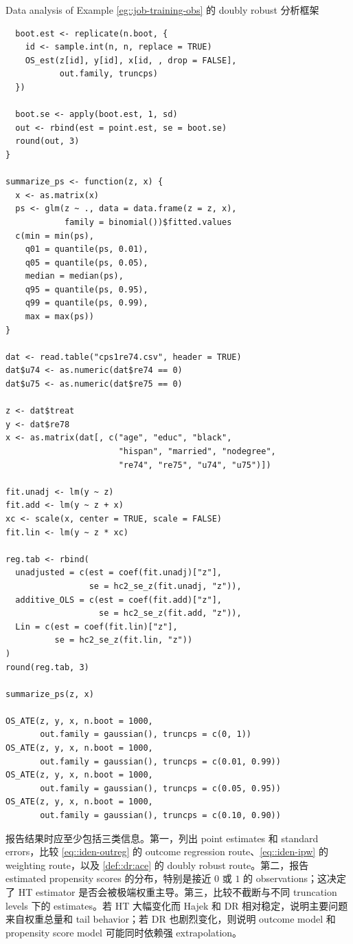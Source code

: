 \begin{exercisesolution}{Data analysis of Example \cref{eg::job-training-obs}}{ 的 doubly robust 分析框架}
\begin{lstlisting}
  boot.est <- replicate(n.boot, {
    id <- sample.int(n, n, replace = TRUE)
    OS_est(z[id], y[id], x[id, , drop = FALSE],
           out.family, truncps)
  })

  boot.se <- apply(boot.est, 1, sd)
  out <- rbind(est = point.est, se = boot.se)
  round(out, 3)
}

summarize_ps <- function(z, x) {
  x <- as.matrix(x)
  ps <- glm(z ~ ., data = data.frame(z = z, x),
            family = binomial())$fitted.values
  c(min = min(ps),
    q01 = quantile(ps, 0.01),
    q05 = quantile(ps, 0.05),
    median = median(ps),
    q95 = quantile(ps, 0.95),
    q99 = quantile(ps, 0.99),
    max = max(ps))
}

dat <- read.table("cps1re74.csv", header = TRUE)
dat$u74 <- as.numeric(dat$re74 == 0)
dat$u75 <- as.numeric(dat$re75 == 0)

z <- dat$treat
y <- dat$re78
x <- as.matrix(dat[, c("age", "educ", "black",
                       "hispan", "married", "nodegree",
                       "re74", "re75", "u74", "u75")])

fit.unadj <- lm(y ~ z)
fit.add <- lm(y ~ z + x)
xc <- scale(x, center = TRUE, scale = FALSE)
fit.lin <- lm(y ~ z * xc)

reg.tab <- rbind(
  unadjusted = c(est = coef(fit.unadj)["z"],
                 se = hc2_se_z(fit.unadj, "z")),
  additive_OLS = c(est = coef(fit.add)["z"],
                   se = hc2_se_z(fit.add, "z")),
  Lin = c(est = coef(fit.lin)["z"],
          se = hc2_se_z(fit.lin, "z"))
)
round(reg.tab, 3)

summarize_ps(z, x)

OS_ATE(z, y, x, n.boot = 1000,
       out.family = gaussian(), truncps = c(0, 1))
OS_ATE(z, y, x, n.boot = 1000,
       out.family = gaussian(), truncps = c(0.01, 0.99))
OS_ATE(z, y, x, n.boot = 1000,
       out.family = gaussian(), truncps = c(0.05, 0.95))
OS_ATE(z, y, x, n.boot = 1000,
       out.family = gaussian(), truncps = c(0.10, 0.90))
\end{lstlisting}

报告结果时应至少包括三类信息。第一，列出 point estimates 和 standard errors，比较 \cref{eq::iden-outreg} 的 outcome regression route、\cref{eq::iden-ipw} 的 weighting route，以及 \cref{def::dr:ace} 的 doubly robust route。第二，报告 estimated propensity scores 的分布，特别是接近 $0$ 或 $1$ 的 observations；这决定了 HT estimator 是否会被极端权重主导。第三，比较不截断与不同 truncation levels 下的 estimates。若 HT 大幅变化而 Hajek 和 DR 相对稳定，说明主要问题来自权重总量和 tail behavior；若 DR 也剧烈变化，则说明 outcome model 和 propensity score model 可能同时依赖强 extrapolation。


\end{exercisesolution}
